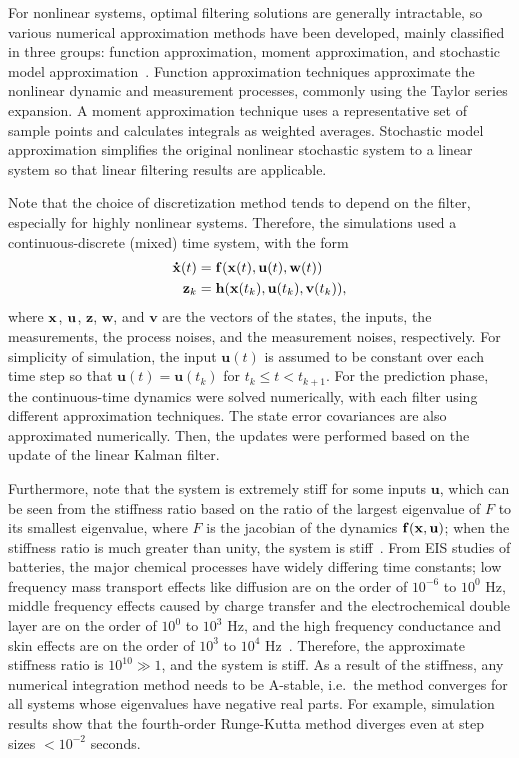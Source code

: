 \documentclass[../zhang_thesis.tex]{subfiles}
\begin{document}
For nonlinear systems, optimal filtering solutions are generally intractable, so various numerical approximation methods have been developed, mainly classified in three groups: function approximation, moment approximation, and stochastic model approximation~\cite{li04}. Function approximation techniques approximate the nonlinear dynamic and measurement processes, commonly using the Taylor series expansion. A moment approximation technique uses a representative
set of sample points and calculates integrals as weighted averages. Stochastic model approximation simplifies the original nonlinear stochastic system to a linear system so that linear filtering results are applicable.

Note that the choice of discretization method tends to depend on the filter, especially for highly nonlinear systems. Therefore, the simulations used a continuous-discrete (mixed) time system, with the form
\begin{align}
    \mathbf{\dot{x}}(t) &= \mathbf{f}(\mathbf{x}(t),\mathbf{u}(t),\mathbf{w}(t)) \label{eq:gen_ct_f} \\
    \mathbf{z}_k &= \mathbf{h}(\mathbf{x}(t_k),\mathbf{u}(t_k),\mathbf{v}(t_k)),
\end{align}
where $\mathbf{x}$, $\mathbf{u}$, $\mathbf{z}$, $\mathbf{w}$, and $\mathbf{v}$ are the vectors of the states, the inputs, the measurements, the process noises, and the measurement noises, respectively. For simplicity of simulation, the input $\mathbf{u}(t)$ is assumed to be constant over each time step so that $\mathbf{u}(t)=\mathbf{u}(t_k)$ for $t_k\le t < t_{k+1}$. For the prediction phase, the continuous-time dynamics were solved numerically, with each filter using different approximation
techniques. The state error covariances are also approximated numerically. Then, the updates were performed based on the update of the linear Kalman filter.

Furthermore, note that the system is extremely stiff for some inputs $\mathbf{u}$, which can be seen from the stiffness ratio based on the ratio of the largest eigenvalue of $F$ to its smallest eigenvalue, where $F$ is the jacobian of the dynamics $\mathbf{f}(\mathbf{x},\mathbf{u})$; when the stiffness ratio is much greater than unity, the system is stiff~\cite{lambert91,brugnano11}. From EIS studies of batteries, the major chemical processes have widely differing time constants; low frequency
mass transport effects like diffusion are on the order of $10^{-6}$ to $10^0$ Hz, middle frequency effects caused by charge transfer and the electrochemical double layer are on the order of $10^0$ to $10^3$ Hz, and the high frequency conductance and skin effects are on the order of $10^3$ to $10^4$ Hz~\cite{jossen06}. Therefore, the approximate stiffness ratio is $10^{10} \gg 1$, and the system is stiff. As a result of the stiffness, any numerical integration method needs to be A-stable,
i.e.\ the method converges for all systems whose eigenvalues have negative real parts. For example, simulation results show that the fourth-order Runge-Kutta method diverges even at step sizes $<10^{-2}$ seconds.
\end{document}
